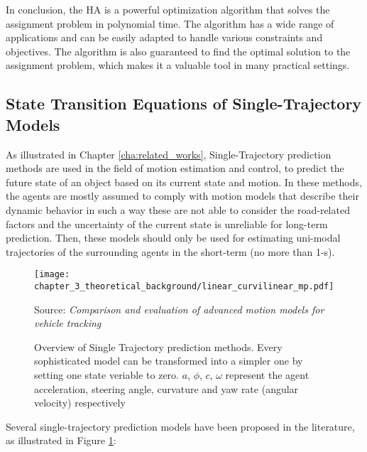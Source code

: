In conclusion, the \ac{HA} is a powerful optimization algorithm that solves the assignment problem in polynomial time. The algorithm has a wide range of applications and can be easily adapted to handle various constraints and objectives. The algorithm is also guaranteed to find the optimal solution to the assignment problem, which makes it a valuable tool in many practical settings.
	
\subsection{State Transition Equations of Single-Trajectory Models}
\label{subsec:3_state_transitions_single_traj}

As illustrated in Chapter \ref{cha:related_works}, Single-Trajectory prediction methods are used in the field of motion estimation and control, to predict the future state of an object based on its current state and motion. In these methods, the agents are mostly assumed to comply with motion models that describe their dynamic behavior in such a way these are not able to consider the road-related factors and the uncertainty of the current state is unreliable for long-term prediction. Then, these models should only be used for estimating uni-modal trajectories of the surrounding agents in the short-term (no more than 1-s).

\begin{figure}[h]
	\centering
	\texttt{[image: chapter\_3\_theoretical\_background/linear\_curvilinear\_mp.pdf]}
	\captionsetup{justification=justified}
	\caption[Overview of Single Trajectory prediction methods]{Overview of Single Trajectory prediction methods. Every sophisticated model can be transformed into a simpler one by setting one state veriable to zero. $a$, $\phi$, $c$, $\omega$ represent the agent acceleration, steering angle, curvature and yaw rate (angular velocity) respectively}
	Source: \textit{Comparison and evaluation of advanced motion models for vehicle tracking} \cite{schubert2008comparison}
	\label{fig:chapter_3_theoretical_background/linear_curvilinear_mp}
\end{figure}


Several single-trajectory prediction models have been proposed in the literature, as illustrated in Figure \ref{fig:chapter_3_theoretical_background/linear_curvilinear_mp}:

